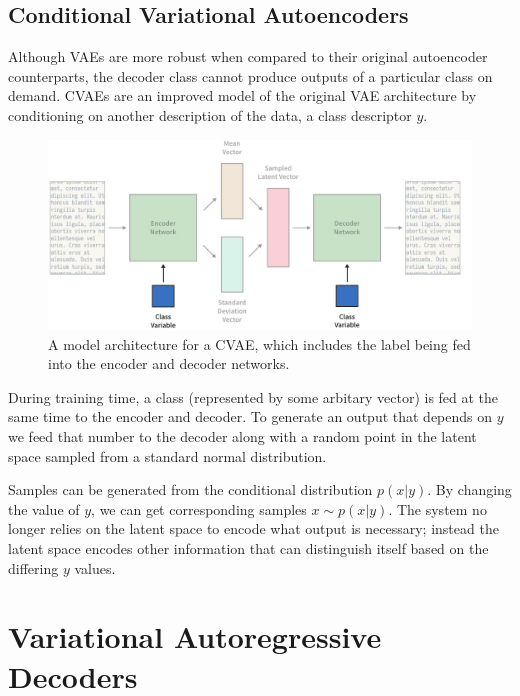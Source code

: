 \documentclass[12pt,twoside]{report}
\begin{document}
\subsection{Conditional Variational Autoencoders}

Although VAEs are more robust when compared to their original autoencoder counterparts, the decoder class cannot produce outputs of a particular class on demand. CVAEs are an improved model of the original VAE architecture by conditioning on another description of the data, a class descriptor $y$. 

\begin{figure}[!ht]
      
	\centering
	\includegraphics[width=150mm]{diagrams/conditional_variational_autoencoders.pdf}
	\caption{A model architecture for a CVAE, which includes the label being fed into the encoder and decoder networks. \label{cvae_diagram}}
  \end{figure}

During training time, a class (represented by some arbitary vector) is fed at the same time to the encoder and decoder. To generate an output that depends on $y$ we feed that number to the decoder along with a random point in the latent space sampled from a standard normal distribution.

Samples can be generated from the conditional distribution $p(x|y)$. By changing the value of $y$, we can get corresponding samples $x \sim p(x|y)$. The system no longer relies on the latent space to encode what output is necessary; instead the latent space encodes other information that can distinguish itself based on the differing $y$ values.


\section{Variational Autoregressive Decoders}
\end{document}
